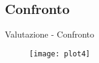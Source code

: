 \subsection{Confronto}
\begin{frame}{Valutazione - Confronto}
	\begin{figure}
	\texttt{[image: plot4]}
	\end{figure}
	
\end{frame}